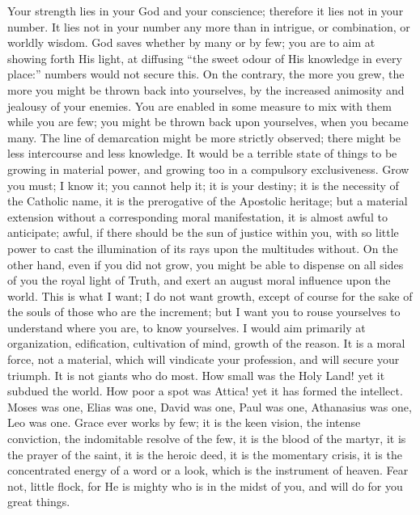 Your strength lies in your God and your conscience;
therefore it lies not in your number. It lies not in your
number any more than in intrigue, or combination, or
worldly wisdom. God saves whether by many or by few; you
are to aim at showing forth His light, at diffusing
``the sweet odour of His knowledge in every
place:'' numbers would not secure this. On the
contrary, the more you grew, the more you might be thrown
back into yourselves, by the increased animosity and
jealousy of your enemies. You are enabled in some measure
to mix with them while you are few; you might be thrown
back upon yourselves, when you became many. The line of
demarcation might be more strictly observed; there might
be less intercourse and less knowledge. It would be a
terrible state of things to be growing in material power,
and growing too in a compulsory exclusiveness. Grow you
must; I know it; you cannot help it; it is your destiny;
it is the necessity of the Catholic name, it is the
prerogative of the Apostolic heritage; but a material
extension without a corresponding moral manifestation, it
is almost awful to anticipate; awful, if there should be
the sun of justice within you, with so little power to
cast the illumination of its rays upon the multitudes
without. On the other hand, even if you did not grow, you
might be able to dispense on all sides of you the royal
light of Truth, and exert an august moral influence upon
the world. This is what I want; I do not want growth,
except of course for the sake of the souls of those who
are the increment; but I want you to rouse yourselves to
understand where you are, to know yourselves. I would aim
primarily at organization, edification, cultivation of
mind, growth of the reason. It is a moral force, not a
material, which will vindicate your profession, and will
secure your triumph. It is not giants who do most. How
small was the Holy Land! yet it subdued the world. How
poor a spot was Attica! yet it has formed the intellect.
Moses was one, Elias was one, David was one, Paul was
one, Athanasius was one, Leo was one. Grace ever works by
few; it is the keen vision, the intense conviction, the
indomitable resolve of the few, it is the blood of the
martyr, it is the prayer of the saint, it is the heroic
deed, it is the momentary crisis, it is the concentrated
energy of a word or a look, which is the instrument of heaven. Fear not, little flock, for He is mighty who is
in the midst of you, and will do for you great things.


